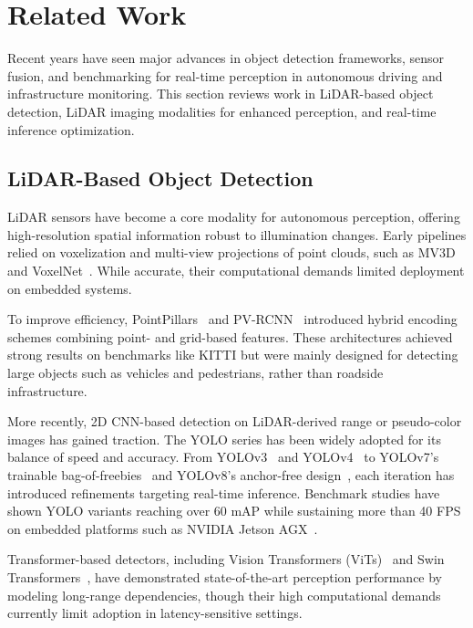 \documentclass[runningheads]{llncs}
\begin{document}
\section{Related Work}

Recent years have seen major advances in object detection frameworks, sensor fusion, and benchmarking for real-time perception in autonomous driving and infrastructure monitoring. This section reviews work in LiDAR-based object detection, LiDAR imaging modalities for enhanced perception, and real-time inference optimization.

\subsection{LiDAR-Based Object Detection}

LiDAR sensors have become a core modality for autonomous perception, offering high-resolution spatial information robust to illumination changes. Early pipelines relied on voxelization and multi-view projections of point clouds, such as MV3D~\cite{chen2017multi} and VoxelNet~\cite{zhou2018voxelnet}. While accurate, their computational demands limited deployment on embedded systems.

To improve efficiency, PointPillars~\cite{lang2019pointpillars} and PV-RCNN~\cite{shi2020pv} introduced hybrid encoding schemes combining point- and grid-based features. These architectures achieved strong results on benchmarks like KITTI but were mainly designed for detecting large objects such as vehicles and pedestrians, rather than roadside infrastructure.

More recently, 2D CNN-based detection on LiDAR-derived range or pseudo-color images has gained traction. The YOLO series has been widely adopted for its balance of speed and accuracy. From YOLOv3~\cite{redmon2018yolov3} and YOLOv4~\cite{bochkovskiy2020yolov4} to YOLOv7’s trainable bag-of-freebies~\cite{wang2023yolov7} and YOLOv8’s anchor-free design~\cite{jocher2023ultralytics}, each iteration has introduced refinements targeting real-time inference. Benchmark studies have shown YOLO variants reaching over 60 mAP while sustaining more than 40 FPS on embedded platforms such as NVIDIA Jetson AGX~\cite{lazarevich2023yolobench}.

Transformer-based detectors, including Vision Transformers (ViTs)~\cite{dosovitskiy2020image} and Swin Transformers~\cite{liu2022swin}, have demonstrated state-of-the-art perception performance by modeling long-range dependencies, though their high computational demands currently limit adoption in latency-sensitive settings.
\end{document}
